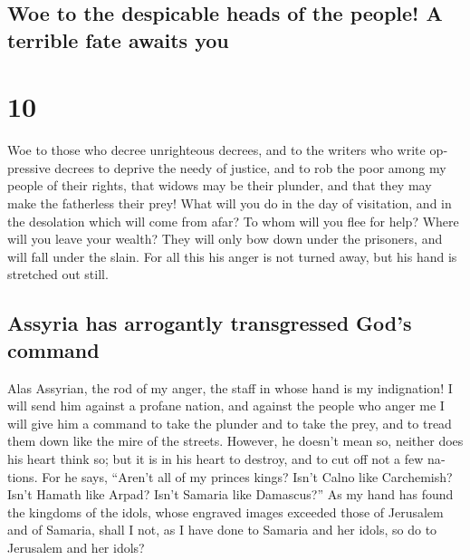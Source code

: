 \begin{paracol}{2}
\begin{otherlanguage}{english}
\hypertarget{woe-to-the-despicable-heads-of-the-people-a-terrible-fate-awaits-you}{%
\subsection{Woe to the despicable heads of the people! A terrible fate
awaits
you}\label{woe-to-the-despicable-heads-of-the-people-a-terrible-fate-awaits-you}}

\hypertarget{section-19}{%
\section{10}\label{section-19}}

 Woe to those who decree unrighteous decrees, and to the
writers who write oppressive decrees  to deprive the needy
of justice, and to rob the poor among my people of their rights, that
widows may be their plunder, and that they may make the fatherless their
prey!  What will you do in the day of visitation, and in
the desolation which will come from afar? To whom will you flee for
help? Where will you leave your wealth?  They will only
bow down under the prisoners, and will fall under the slain. For all
this his anger is not turned away, but his hand is stretched out still.

\hypertarget{assyria-has-arrogantly-transgressed-gods-command}{%
\subsection{Assyria has arrogantly transgressed God's
command}\label{assyria-has-arrogantly-transgressed-gods-command}}

 Alas Assyrian, the rod of my anger, the staff in whose
hand is my indignation!  I will send him against a profane
nation, and against the people who anger me I will give him a command to
take the plunder and to take the prey, and to tread them down like the
mire of the streets.  However, he doesn't mean so, neither
does his heart think so; but it is in his heart to destroy, and to cut
off not a few nations.  For he says, ``Aren't all of my
princes kings?  Isn't Calno like Carchemish? Isn't Hamath
like Arpad? Isn't Samaria like Damascus?''  As my hand
has found the kingdoms of the idols, whose engraved images exceeded
those of Jerusalem and of Samaria,  shall I not, as I
have done to Samaria and her idols, so do to Jerusalem and her idols?


\end{otherlanguage}
\end{paracol}
